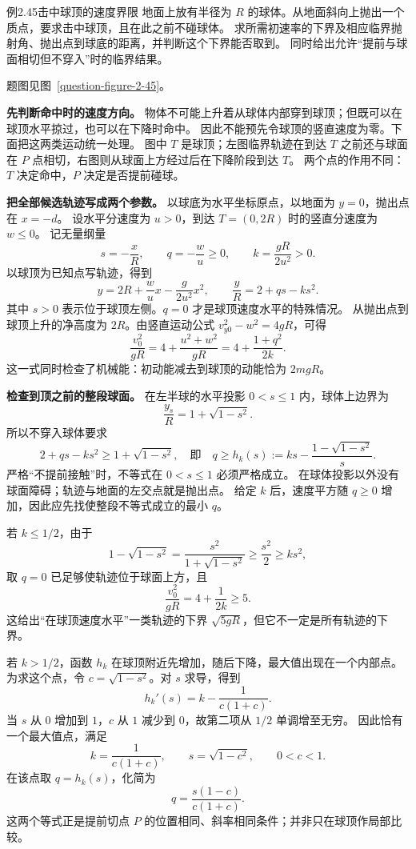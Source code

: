 \begin{origexamplebox}{例2.45\quad 击中球顶的速度界限}
地面上放有半径为 $R$ 的球体。从地面斜向上抛出一个质点，要求击中球顶，且在此之前不碰球体。
求所需初速率的下界及相应临界抛射角、抛出点到球底的距离，并判断这个下界能否取到。
同时给出允许“提前与球面相切但不穿入”时的临界结果。
\par 题图见图~\ref{question-figure-2-45}。
\KQuestionBT
\end{origexamplebox}
\begin{xesolution}
\textbf{先判断命中时的速度方向。}
物体不可能上升着从球体内部穿到球顶；但既可以在球顶水平掠过，也可以在下降时命中。
因此不能预先令球顶的竖直速度为零。下面把这两类运动统一处理。
\SphereClearanceDiagram
图中 $T$ 是球顶；左图临界轨迹在到达 $T$ 之前还与球面在 $P$ 点相切，右图则从球面上方经过后在下降阶段到达 $T$。
两个点的作用不同：$T$ 决定命中，$P$ 决定是否提前碰球。

\textbf{把全部候选轨迹写成两个参数。}
以球底为水平坐标原点，以地面为 $y=0$，抛出点在 $x=-d$。
设水平分速度为 $u>0$，到达 $T=(0,2R)$ 时的竖直分速度为 $w\le0$。
记无量纲量
\[
 s=-\frac{x}{R},\qquad q=-\frac wu\ge0,\qquad
 k=\frac{gR}{2u^2}>0.
\]
以球顶为已知点写轨迹，得到
\[
 y=2R+\frac wu x-\frac{g}{2u^2}x^2,
 \qquad \boxed{\frac{y}{R}=2+qs-ks^2}.
\]
其中 $s>0$ 表示位于球顶左侧。$q=0$ 才是球顶速度水平的特殊情况。
从抛出点到球顶上升的净高度为 $2R$。由竖直运动公式
$v_{y0}^2-w^2=4gR$，可得
\[
 \frac{v_0^2}{gR}
 =4+\frac{u^2+w^2}{gR}
 =\boxed{4+\frac{1+q^2}{2k}}.
\]
这一式同时检查了机械能：初动能减去到球顶的动能恰为 $2mgR$。

\textbf{检查到顶之前的整段球面。}
在左半球的水平投影 $0<s\le1$ 内，球体上边界为
\[
 \frac{y_s}{R}=1+\sqrt{1-s^2}.
\]
所以不穿入球体要求
\[
 2+qs-ks^2\ge1+\sqrt{1-s^2},
 \quad\text{即}\quad
 q\ge h_k(s):=ks-\frac{1-\sqrt{1-s^2}}{s}.
\]
严格“不提前接触”时，不等式在 $0<s\le1$ 必须严格成立。
在球体投影以外没有球面障碍；轨迹与地面的左交点就是抛出点。
给定 $k$ 后，速度平方随 $q\ge0$ 增加，因此应先找使整段不等式成立的最小 $q$。

若 $k\le1/2$，由于
\[
 1-\sqrt{1-s^2}=\frac{s^2}{1+\sqrt{1-s^2}}\ge\frac{s^2}{2}\ge ks^2,
\]
取 $q=0$ 已足够使轨迹位于球面上方，且
\[
 \frac{v_0^2}{gR}=4+\frac1{2k}\ge5.
\]
这给出“在球顶速度水平”一类轨迹的下界 $\sqrt{5gR}$，但它不一定是所有轨迹的下界。

若 $k>1/2$，函数 $h_k$ 在球顶附近先增加，随后下降，最大值出现在一个内部点。
为求这个点，令 $c=\sqrt{1-s^2}$。对 $s$ 求导，得到
\[
 h_k'(s)=k-\frac1{c(1+c)}.
\]
当 $s$ 从 $0$ 增加到 $1$，$c$ 从 $1$ 减少到 $0$，故第二项从 $1/2$ 单调增至无穷。
因此恰有一个最大值点，满足
\[
 k=\frac1{c(1+c)},\qquad s=\sqrt{1-c^2},\qquad 0<c<1.
\]
在该点取 $q=h_k(s)$，化简为
\[
 q=\frac{s(1-c)}{c(1+c)}.
\]
这两个等式正是提前切点 $P$ 的位置相同、斜率相同条件；并非只在球顶作局部比较。


\end{xesolution}
